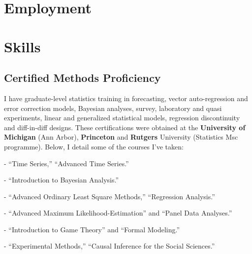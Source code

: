 \documentclass[letterpaper]{article}
\renewenvironment{itemize}{
  \begin{list}{}{
    \setlength{\leftmargin}{1.5em}
  }
}{
  \end{list}
}
\begin{document}
{\unskip}

\section*{Employment}

{\unskip}



\section*{Skills}


\subsection*{Certified Methods Proficiency}

I have graduate-level statistics training in forecasting, vector auto-regression and error correction models, Bayesian analyses, survey, laboratory and quasi experiments, linear and generalized statistical models, regression discontinuity and diff-in-diff designs. These certifications were obtained at the {\bf University of Michigan} (Ann Arbor), {\bf Princeton} and {\bf Rutgers} University (Statistics Msc programme). Below, I detail some of the courses I've taken:

\begin{itemize}
	\item- ``Time Series,'' ``Advanced Time Series.''
	\item- ``Introduction to Bayesian Analysis.'' 
	\item- ``Advanced Ordinary Least Square Methods,'' ``Regression Analysis.''
	\item- ``Advanced Maximum Likelihood-Estimation'' and ``Panel Data Analyses.''
	\item- ``Introduction to Game Theory'' and ``Formal Modeling.''
	\item- ``Experimental Methods,'' ``Causal Inference for the Social Sciences.''
\end{itemize}
\end{document}
